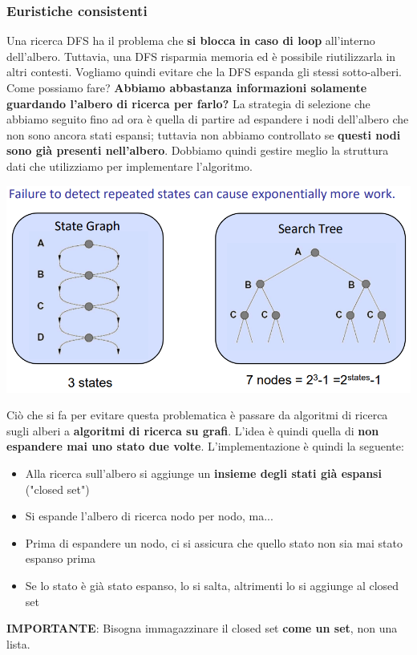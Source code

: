 \documentclass[12pt]{article}
\begin{document}
\subsubsection{Euristiche consistenti}
Una ricerca DFS ha il problema che \textbf{si blocca in caso di loop} all'interno dell'albero.
Tuttavia, una DFS risparmia memoria ed è possibile riutilizzarla in altri contesti.
Vogliamo quindi evitare che la DFS espanda gli stessi sotto-alberi.
Come possiamo fare? \textbf{Abbiamo abbastanza informazioni solamente guardando l'albero di ricerca per farlo?}
La strategia di selezione che abbiamo seguito fino ad ora è quella di partire ad espandere i nodi dell'albero che non sono ancora stati espansi;
tuttavia non abbiamo controllato se \textbf{questi nodi sono già presenti nell'albero}. Dobbiamo quindi gestire meglio la struttura dati che utilizziamo
per implementare l'algoritmo.
\begin{center}
    \includegraphics[width =0.90\linewidth]{Images/48.PNG}
\end{center}
Ciò che si fa per evitare questa problematica è passare da algoritmi di ricerca sugli alberi a \textbf{algoritmi di ricerca su grafi}.
L'idea è quindi quella di \textbf{non espandere mai uno stato due volte}.
L'implementazione è quindi la seguente:
\begin{itemize}
    \item Alla ricerca sull'albero si aggiunge un \textbf{insieme degli stati già espansi} ("closed set")
    \item Si espande l'albero di ricerca nodo per nodo, ma... 
    \item Prima di espandere un nodo, ci si assicura che quello stato non sia mai stato espanso prima
    \item Se lo stato è già stato espanso, lo si salta, altrimenti lo si aggiunge al closed set
\end{itemize}
\textbf{IMPORTANTE}: Bisogna immagazzinare il closed set \textbf{come un set}, non una lista. \newline
\end{document}
